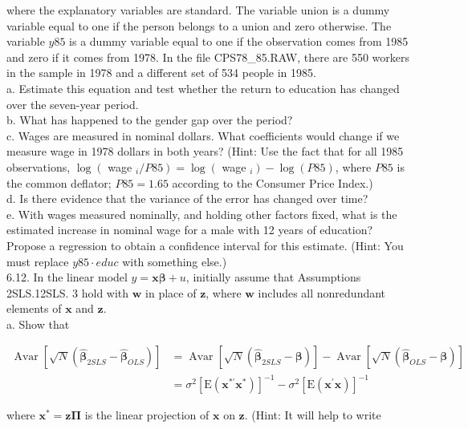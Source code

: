 \documentclass[10pt]{article}
\begin{document}
where the explanatory variables are standard. The variable union is a dummy variable equal to one if the person belongs to a union and zero otherwise. The variable $y 85$ is a dummy variable equal to one if the observation comes from 1985 and zero if it comes from 1978. In the file CPS78\_85.RAW, there are 550 workers in the sample in 1978 and a different set of 534 people in 1985.\\
a. Estimate this equation and test whether the return to education has changed over the seven-year period.\\
b. What has happened to the gender gap over the period?\\
c. Wages are measured in nominal dollars. What coefficients would change if we measure wage in 1978 dollars in both years? (Hint: Use the fact that for all 1985 observations, $\log \left(\right.$ wage $\left._{i} / P 85\right)=\log \left(\right.$ wage $\left._{i}\right)-\log (P 85)$, where $P 85$ is the common deflator; $P 85=1.65$ according to the Consumer Price Index.)\\
d. Is there evidence that the variance of the error has changed over time?\\
e. With wages measured nominally, and holding other factors fixed, what is the estimated increase in nominal wage for a male with 12 years of education? Propose a regression to obtain a confidence interval for this estimate. (Hint: You must replace $y 85 \cdot e d u c$ with something else.)\\
6.12. In the linear model $y=\mathbf{x} \boldsymbol{\beta}+u$, initially assume that Assumptions 2SLS.12SLS. 3 hold with $\mathbf{w}$ in place of $\mathbf{z}$, where $\mathbf{w}$ includes all nonredundant elements of $\mathbf{x}$ and $\mathbf{z}$.\\
a. Show that

$$
\begin{aligned}
\operatorname{Avar}\left[\sqrt{N}\left(\hat{\boldsymbol{\beta}}_{2 S L S}-\hat{\boldsymbol{\beta}}_{O L S}\right)\right] & =\operatorname{Avar}\left[\sqrt{N}\left(\hat{\boldsymbol{\beta}}_{2 S L S}-\boldsymbol{\beta}\right)\right]-\operatorname{Avar}\left[\sqrt{N}\left(\hat{\boldsymbol{\beta}}_{O L S}-\boldsymbol{\beta}\right)\right] \\
& =\sigma^{2}\left[\mathrm{E}\left(\mathbf{x}^{* \prime} \mathbf{x}^{*}\right)\right]^{-1}-\sigma^{2}\left[\mathrm{E}\left(\mathbf{x}^{\prime} \mathbf{x}\right)\right]^{-1}
\end{aligned}
$$

where $\mathbf{x}^{*}=\mathbf{z} \boldsymbol{\Pi}$ is the linear projection of $\mathbf{x}$ on $\mathbf{z}$. (Hint: It will help to write
\end{document}
